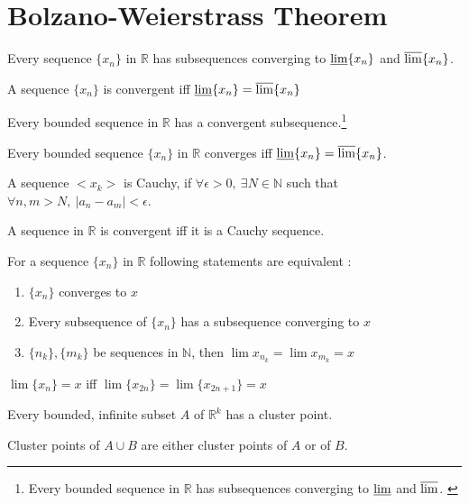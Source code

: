 \section{Bolzano-Weierstrass Theorem}
	\begin{theorem}
		Every sequence $\{x_n\}$ in $\mathbb{R}$ has subsequences converging to $\varliminf \{x_n\}$ and $\varlimsup \{x_n\}$.
	\end{theorem}
	\begin{remark}
		A sequence $\{x_n\}$ is convergent iff $\varliminf \{x_n\} = \varlimsup \{x_n\}$
	\end{remark}
	\begin{theorem}
		Every bounded sequence in $\mathbb{R}$ has a convergent subsequence.\footnote{Every bounded sequence in $\mathbb{R}$ has subsequences converging to $\varliminf$ and $\varlimsup$. \cite{aliprant}}
	\end{theorem}
	\begin{theorem}
		Every bounded sequence $\{x_n\}$ in $\mathbb{R}$ converges iff $\varliminf \{ x_n \} = \varlimsup \{ x_n \}$.
	\end{theorem}
	\begin{definition}
		A sequence $<x_k>$ is Cauchy, if $\forall \epsilon > 0,\ \exists N \in \mathbb{N}$ such that $\forall n,m > N,\ |a_n-a_m|<\epsilon$.
	\end{definition}
	\begin{theorem}[Cauchy]
		A sequence in $\mathbb{R}$ is convergent iff it is a Cauchy sequence.
	\end{theorem}
	\begin{remark}
		For a sequence $\{ x_n \}$ in $\mathbb{R}$ following statements are equivalent :
		\begin{enumerate} 
			\item $\{ x_n \}$ converges to $x$
			\item Every subsequence of $\{ x_n \}$ has a subsequence converging to $x$
			\item $\{ n_k \}, \{ m_k \}$ be sequences in $\mathbb{N}$, then $\lim x_{n_k} = \lim x_{m_k} = x$
		\end{enumerate}
	\end{remark}
	\begin{remark}
		$\lim \{ x_n \} = x$ iff $\lim \{ x_{2n} \} = \lim \{ x_{2n+1}\} = x$
	\end{remark}
	\begin{theorem}
		Every bounded, infinite subset $A$ of $\mathbb{R}^k$ has a cluster point.
	\end{theorem}
	\begin{remark}
		Cluster points of $A \cup B$ are either cluster points of $A$ or of $B$.
	\end{remark}

